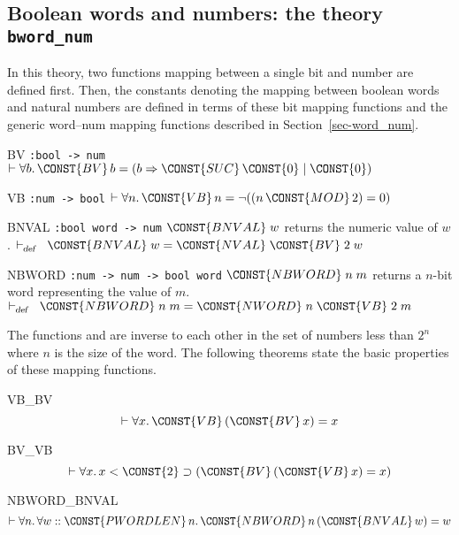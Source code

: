 \subsection{Boolean words and numbers: the theory {\tt bword\_num}}\label{sec-bword_num}

In this theory, two functions mapping between a single bit and number
are defined first. Then, the constants denoting the mapping between
boolean words and natural numbers are defined in terms of these bit
mapping functions and the generic word--num mapping functions
described in Section~\ref{sec-word_num}.
\begin{center}
\begin{constants}
\item[BV] \verb":bool -> num"\newline
        $\THM \FORALL b\DOT
        \CONST{BV} \,b =
           (b \Rightarrow  \CONST{SUC} \,\CONST{0} \mid  \CONST{0})$
\item[VB] \verb":num -> bool"\newline
        $\THM \FORALL n\DOT
         \CONST{VB}\,n = \NOT((n\, \CONST{MOD}\,2) = 0)$
\item[BNVAL] \verb":bool word -> num" \newline
        $\CONST{BNVAL}\;w$ returns the numeric value of $w$.
        $\DEF \CONST{BNVAL}\;w = \CONST{NVAL}\;\CONST{BV}\;2\;w$
\item[NBWORD] \verb":num -> num -> bool word"\newline
        $\CONST{NBWORD}\;n\;m$ returns a $n$-bit word representing
        the value of $m$.\linebreak
        $\DEF \CONST{NBWORD}\;n\;m = \CONST{NWORD}\;n\;\CONST{VB}\;2\;m$
\end{constants}
\end{center}
The functions  and  are inverse to each
other in the set of numbers less than $2^n$ where $n$ is the size of
the word. The following theorems state the basic properties of these
mapping functions.
\begin{holthm}{VB_BV}
\[ \THM \FORALL x\DOT \CONST{VB} \,(\CONST{BV} \,x) = x \]
\end{holthm}
\begin{holthm}{BV_VB}
\[ \THM \FORALL x\DOT
        x \LES  \CONST{2} \IMP  (\CONST{BV} \,(\CONST{VB} \,x) = x) \]
\end{holthm}
\begin{holthm}{NBWORD_BNVAL}
\[\THM \FORALL n\DOT
        \FORALL w :: \CONST{PWORDLEN} \,n \DOT
                 \CONST{NBWORD} \,n \,(\CONST{BNVAL} \,w) = w \]
\end{holthm}
